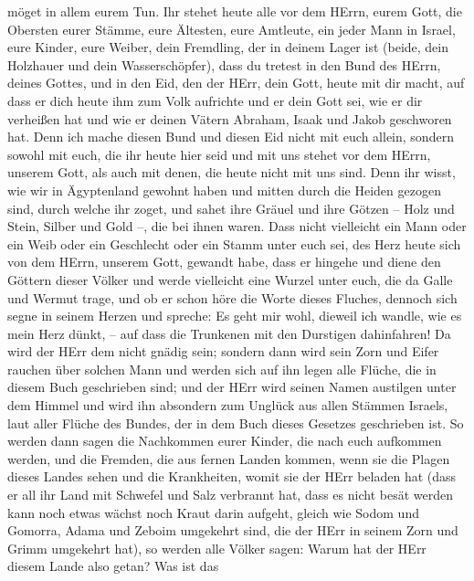 möget in allem eurem Tun.  Ihr stehet heute alle vor dem
HErrn, eurem Gott, die Obersten eurer Stämme, eure Ältesten, eure
Amtleute, ein jeder Mann in Israel,  eure Kinder, eure
Weiber, dein Fremdling, der in deinem Lager ist (beide, dein Holzhauer
und dein Wasserschöpfer),  dass du tretest in den Bund des
HErrn, deines Gottes, und in den Eid, den der HErr, dein Gott, heute mit
dir macht,  auf dass er dich heute ihm zum Volk aufrichte
und er dein Gott sei, wie er dir verheißen hat und wie er deinen Vätern
Abraham, Isaak und Jakob geschworen hat.  Denn ich mache
diesen Bund und diesen Eid nicht mit euch allein,  sondern
sowohl mit euch, die ihr heute hier seid und mit uns stehet vor dem
HErrn, unserem Gott, als auch mit denen, die heute nicht mit uns sind.
 Denn ihr wisst, wie wir in Ägyptenland gewohnt haben und
mitten durch die Heiden gezogen sind, durch welche ihr zoget,
 und sahet ihre Gräuel und ihre Götzen -- Holz und Stein,
Silber und Gold --, die bei ihnen waren.  Dass nicht
vielleicht ein Mann oder ein Weib oder ein Geschlecht oder ein Stamm
unter euch sei, des Herz heute sich von dem HErrn, unserem Gott, gewandt
habe, dass er hingehe und diene den Göttern dieser Völker und werde
vielleicht eine Wurzel unter euch, die da Galle und Wermut trage,
 und ob er schon höre die Worte dieses Fluches, dennoch
sich segne in seinem Herzen und spreche: Es geht mir wohl, dieweil ich
wandle, wie es mein Herz dünkt, -- auf dass die Trunkenen mit den
Durstigen dahinfahren!  Da wird der HErr dem nicht gnädig
sein; sondern dann wird sein Zorn und Eifer rauchen über solchen Mann
und werden sich auf ihn legen alle Flüche, die in diesem Buch
geschrieben sind; und der HErr wird seinen Namen austilgen unter dem
Himmel  und wird ihn absondern zum Unglück aus allen
Stämmen Israels, laut aller Flüche des Bundes, der in dem Buch dieses
Gesetzes geschrieben ist.  So werden dann sagen die
Nachkommen eurer Kinder, die nach euch aufkommen werden, und die
Fremden, die aus fernen Landen kommen, wenn sie die Plagen dieses Landes
sehen und die Krankheiten, womit sie der HErr beladen hat 
(dass er all ihr Land mit Schwefel und Salz verbrannt hat, dass es nicht
besät werden kann noch etwas wächst noch Kraut darin aufgeht, gleich wie
Sodom und Gomorra, Adama und Zeboim umgekehrt sind, die der HErr in
seinem Zorn und Grimm umgekehrt hat),  so werden alle
Völker sagen: Warum hat der HErr diesem Lande also getan? Was ist das
